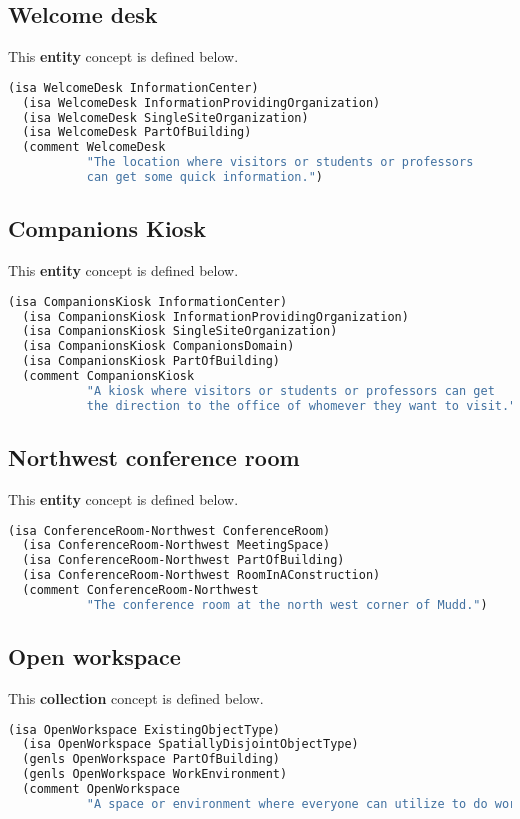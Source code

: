 \documentclass[11pt]{article}
\begin{document}
\subsection{Welcome desk}
This \textbf{entity} concept is defined below.
\begin{lstlisting}[language=lisp]
  (isa WelcomeDesk InformationCenter)
  (isa WelcomeDesk InformationProvidingOrganization)
  (isa WelcomeDesk SingleSiteOrganization)
  (isa WelcomeDesk PartOfBuilding)
  (comment WelcomeDesk
           "The location where visitors or students or professors 
           can get some quick information.")
\end{lstlisting}

\subsection{Companions Kiosk}
This \textbf{entity} concept is defined below.
\begin{lstlisting}[language=lisp]
  (isa CompanionsKiosk InformationCenter)
  (isa CompanionsKiosk InformationProvidingOrganization)
  (isa CompanionsKiosk SingleSiteOrganization)
  (isa CompanionsKiosk CompanionsDomain)
  (isa CompanionsKiosk PartOfBuilding)
  (comment CompanionsKiosk
           "A kiosk where visitors or students or professors can get 
           the direction to the office of whomever they want to visit.")
\end{lstlisting}

\subsection{Northwest conference room}
This \textbf{entity} concept is defined below.
\begin{lstlisting}[language=lisp]
  (isa ConferenceRoom-Northwest ConferenceRoom)
  (isa ConferenceRoom-Northwest MeetingSpace)
  (isa ConferenceRoom-Northwest PartOfBuilding)
  (isa ConferenceRoom-Northwest RoomInAConstruction)
  (comment ConferenceRoom-Northwest
           "The conference room at the north west corner of Mudd.")
\end{lstlisting}

\subsection{Open workspace}
This \textbf{collection} concept is defined below.
\begin{lstlisting}[language=lisp]
  (isa OpenWorkspace ExistingObjectType)
  (isa OpenWorkspace SpatiallyDisjointObjectType)
  (genls OpenWorkspace PartOfBuilding)
  (genls OpenWorkspace WorkEnvironment)
  (comment OpenWorkspace
           "A space or environment where everyone can utilize to do work.")
\end{lstlisting}
\end{document}
